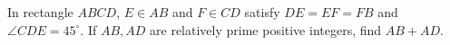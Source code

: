 In rectangle $ABCD$, $E\in AB$ and $F\in CD$ satisfy $DE=EF=FB$ and $\angle CDE=45^\circ$. If $AB,AD$ are relatively prime positive integers, find $AB+AD$.

